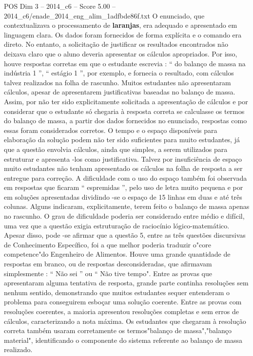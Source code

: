 \begin{textsample}{POS Dim 3 – 2014\_c6 – Score 5.00 – 2014\_c6/enade\_2014\_eng\_alim\_1adfbde86f.txt}
O enunciado, que contextualizava o processamento de \textbf{laranjas}, era adequado e apresentado em linguagem clara.
Os dados foram fornecidos de forma explícita e o comando era direto.
No entanto, a solicitação de justificar os resultados encontrados não deixava claro que o aluno deveria apresentar os cálculos apropriados.
Por isso, houve respostas corretas em que o estudante escrevia : “ do balanço de massa na indústria 1 ”, “ estágio 1 ”, por exemplo, e fornecia o resultado, com cálculos talvez realizados na folha de rascunho.
Muitos estudantes não apresentaram cálculos, apesar de apresentarem justificativas baseadas no balanço de massa.
Assim, por não ter sido explicitamente solicitada a apresentação de cálculos e por considerar que o estudante só chegaria à resposta correta se calculasse os termos do balanço de massa, a partir dos dados fornecidos no enunciado, respostas como essas foram considerados corretos.
O tempo e o espaço disponíveis para elaboração da solução podem não ter sido suficientes para muito estudantes, já que a questão envolvia cálculos, ainda que simples, a serem utilizados para estruturar e apresenta -los como justificativa.
Talvez por insuficiência de espaço muito estudantes não tenham apresentado os cálculos na folha de resposta a ser entregue para correção.
A dificuldade com o uso do espaço também foi observada em respostas que ficaram “ espremidas ”, pelo uso de letra muito pequena e por em soluções apresentadas dividindo -se o espaço de 15 linhas em duas e até três colunas.
Alguns indicaram, explicitamente, terem feito o balanço de massa apenas no rascunho.
O grau de dificuldade poderia ser considerado entre médio e difícil, uma vez que a questão exigia estruturação de raciocínio lógico-matemático.
Apesar disso, pode -se afirmar que a questão 5, entre as três questões discursivas de Conhecimento Específico, foi a que melhor poderia traduzir o"core competence"do Engenheiro de Alimentos.
Houve uma grande quantidade de respostas em branco, ou de respostas desconsideradas, que afirmavam simplesmente : “ Não sei ” ou “ Não tive tempo".
Entre as provas que apresentaram alguma tentativa de resposta, grande parte continha resoluções sem nenhum sentido, demonstrando que muitos estudantes sequer entenderam o problema para conseguirem esboçar uma solução coerente.
Entre as provas com resoluções coerentes, a maioria apresentou resoluções completas e sem erros de cálculos, caracterizando a nota máxima.
Os estudantes que chegaram à resolução correta também usaram corretamente os termos"balanço de massa","balanço material", identificando o componente do sistema referente ao balanço de massa realizado.

\end{textsample}
